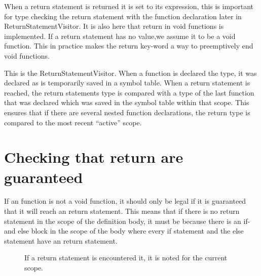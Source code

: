 When a return statement is returned it is set to its expression, this is important for type checking the return statement with the function declaration later in ReturnStatementVisitor.
It is also here that return in void functions is implemented. If a return statement has no value,we assume it to be a void function. This in practice makes the return key-word a way to preemptively end void functions.

\noindent\newline

This is the ReturnStatementVisitor. When a function is declared the type, it was declared as is temporarily saved in a symbol table. When a return statement is reached, the return statements type is compared with a type of the last function that was declared which was saved in the symbol table within that scope. This ensures that if there are several nested function declarations, the return type is compared to the most recent “active” scope.

\noindent\newline


\noindent\newline

\section{Checking that return are guaranteed}
If an function is not a void function, it should only be legal if it is guaranteed that it will reach an return statement. This means that if there is no return statement in the scope of the definition body, it must be because there is an if- and else block in the scope of the body where every if statement and the else statement have an return statement. 

\begin{figure}[H]
\centering
{}
\caption{If a return statement is encountered it, it is noted for the current scope.}
\label{lf05}
\end{figure}

